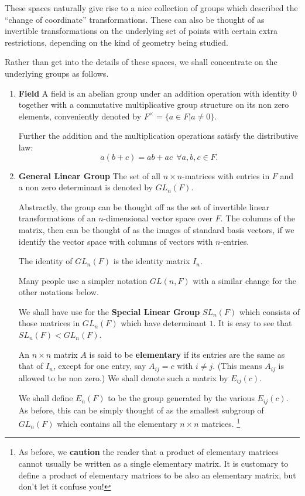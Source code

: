 \documentclass[12pt]{article}
\begin{document}
These spaces naturally give rise to a nice collection of groups which
described the ``change of coordinate'' transformations. These can also
be thought of as invertible transformations on the underlying set of
points with certain extra restrictions, depending on the kind of
geometry being studied.

Rather than get into the details of these spaces, we shall concentrate on
the underlying groups as follows. 

\begin{enumerate}
\item{\bf Field} 
A field is an abelian group under an addition operation with
identity $0$ together with a commutative multiplicative group structure on 
its non zero elements, conveniently denoted by $F^\times = \{ a\in F | a \neq
0\}$.

Further the addition and the multiplication operations satisfy the
distributive law:
$$a(b+c)=ab+ac ~~\forall a,b,c \in F.$$

\item{\bf General Linear Group} 
The set of all $n\times n$-matrices with
entries in $F$ and a non zero determinant is denoted by $GL_n(F)$.

Abstractly, the group can be thought off as the set of invertible linear
transformations of an $n$-dimensional vector space over $F$.
The columns of the matrix, then can be thought of as the images of standard
basis vectors, if we identify the vector space with columns of vectors
with $n$-entries.

The identity of $GL_n(F)$ is the identity matrix $I_n$.

Many people use a simpler notation $GL(n,F)$ with a similar change for
the other notations below.

We shall have use for the {\bf Special Linear Group}
 $SL_n(F)$ which
consists of those matrices in $GL_n(F)$ which have determinant $1$.
It is easy to see that $SL_n(F)<GL_n(F)$.

An $n\times n$ matrix $A$ is said to be {\bf elementary}
if its entries are
the same as that of $I_n$, except for one entry, say $A_{ij} = c$ with
$i\neq j$. (This means $A_{ij}$ is allowed
to be non zero.) We shall denote such a matrix by $E_{ij}(c)$.

We shall define $E_n(F)$ to be the group generated by the various
$E_{ij}(c)$. As before, this can be simply thought of as the smallest
subgroup of $GL_n(F)$ which contains all the elementary $n\times n$ matrices.
\footnote{As before, we {\bf caution} the reader that a product of elementary
matrices cannot usually be written as a single elementary matrix. It is
customary to define a product of elementary matrices to be also an
elementary matrix, but don't let it confuse you!}



\end{enumerate}
\end{document}

